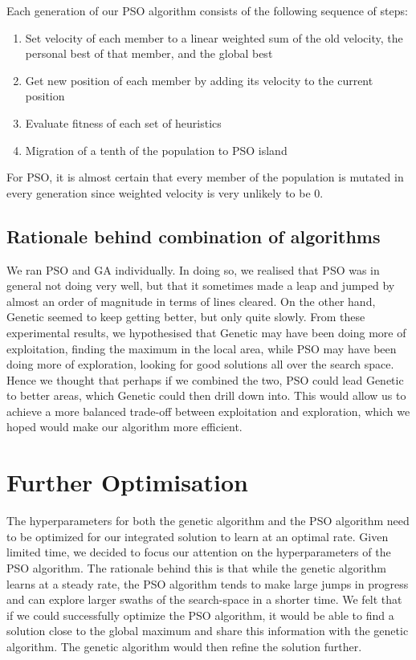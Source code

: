 \documentclass{article}
\begin{document}
Each generation of our PSO algorithm consists of the following sequence of
steps:
\begin{enumerate}
	\item Set velocity of each member to a linear weighted sum of the old
		velocity, the personal best of that member, and the global best
	\item Get new position of each member by adding its velocity to the current
		position
	\item Evaluate fitness of each set of heuristics
	\item Migration of a tenth of the population to PSO island
\end{enumerate}
For PSO, it is almost certain that every member of the population is mutated
in every generation since weighted velocity is very unlikely to be 0.

\subsection{Rationale behind combination of algorithms}
We ran PSO and GA individually. In doing so, we realised that PSO was in
general not doing very well, but that it sometimes made a leap and jumped by
almost an order of magnitude in terms of lines cleared. On the other hand,
Genetic seemed to keep getting better, but only quite slowly. From these
experimental results, we hypothesised that Genetic may have been doing more of
exploitation, finding the maximum in the local area, while PSO may have been
doing more of exploration, looking for good solutions all over the search
space. Hence we thought that perhaps if we combined the two, PSO could lead
Genetic to better areas, which Genetic could then drill down into.  This would
allow us to achieve a more balanced trade-off between exploitation and
exploration, which we hoped would make our algorithm more efficient.

\section{Further Optimisation}
The hyperparameters for both the genetic algorithm and the PSO algorithm need
to be optimized for our integrated solution to learn at an optimal rate.  Given
limited time, we decided to focus our attention on the hyperparameters of the
PSO algorithm. The rationale behind this is that while the genetic algorithm
learns at a steady rate, the PSO algorithm tends to make large jumps in
progress and can explore larger swaths of the search-space in a shorter time.
We felt that if we could successfully optimize the PSO algorithm, it would be
able to find a solution close to the global maximum and share this information
with the genetic algorithm. The genetic algorithm would then refine the
solution further.
\end{document}
